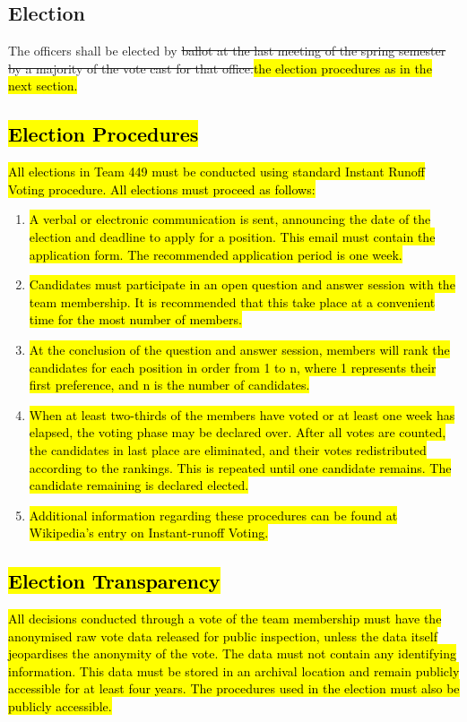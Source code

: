 \documentclass[12pt, a4paper]{article}
\begin{document}
\subsection{Election}
The officers shall be elected by \st{ballot at the last meeting of the spring semester by a majority of the vote cast for that office.}\hl{the election procedures as in the next section.}

\subsection{\hl{Election Procedures}}
\hl{
All elections in Team 449 must be conducted using standard Instant Runoff Voting procedure. All elections must proceed as follows:}
\begin{enumerate}
\item \hl{A verbal or electronic communication is sent, announcing the date of the election and deadline to apply for a position. This email must contain the application form. The recommended application period is one week.}
\item \hl{Candidates must participate in an open question and answer session with the team membership. It is recommended that this take place at a convenient time for the most number of members.}
\item \hl{At the conclusion of the question and answer session, members will rank the candidates for each position in order from 1 to n, where 1 represents their first preference, and n is the number of candidates. }
\item \hl{When at least two-thirds of the members have voted or at least one week has elapsed, the voting phase may be declared over. After all votes are counted, the candidates in last place are eliminated, and their votes redistributed according to the rankings. This is repeated until one candidate remains. The candidate remaining is declared elected.}
\item \hl{Additional information regarding these procedures can be found at Wikipedia's entry on Instant-runoff Voting.}
\end{enumerate}

\subsection{\hl{Election Transparency}}
\hl{
All decisions conducted through a vote of the team membership must have the anonymised raw vote data released for public inspection, unless the data itself jeopardises the anonymity of the vote. 
The data must not contain any identifying information. 
This data must be stored in an archival location and remain publicly accessible for at least four years. 
The procedures used in the election must also be publicly accessible. 
}
\end{document}
